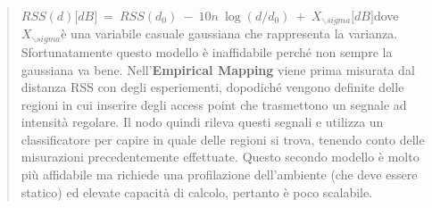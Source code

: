 \begin{quote}
\(RSS(d)\lbrack dB\rbrack\  = \ RSS(d_{0})\  - \ 10n\ \log(d/d_{0})\  + \ X_{\backslash sigma}\lbrack dB\rbrack\)dove
\(X_{\backslash sigma}\)è una variabile casuale gaussiana che
rappresenta la varianza. Sfortunatamente questo modello è inaffidabile
perché non sempre la gaussiana va bene. Nell'\textbf{Empirical Mapping}
viene prima misurata dal distanza RSS con degli esperiementi, dopodiché
vengono definite delle regioni in cui inserire degli access point che
trasmettono un segnale ad intensità regolare. Il nodo quindi rileva
questi segnali e utilizza un classificatore per capire in quale delle
regioni si trova, tenendo conto delle misurazioni precedentemente
effettuate. Questo secondo modello è molto più affidabile ma richiede
una profilazione dell'ambiente (che deve essere statico) ed elevate
capacità di calcolo, pertanto è poco scalabile.
\end{quote}

